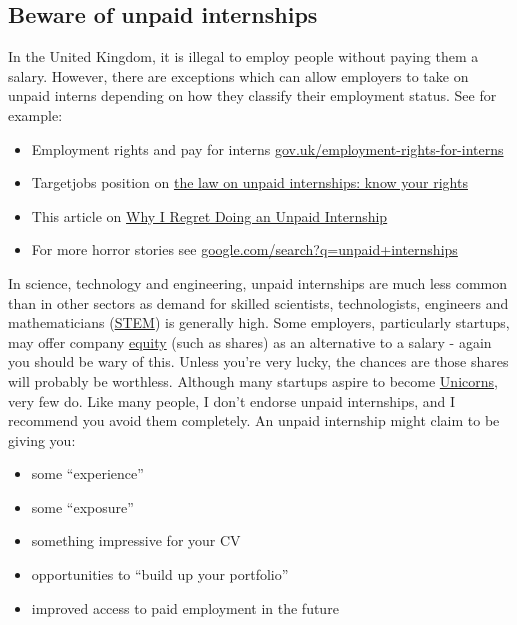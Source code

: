 \documentclass[
]{book}
\providecommand{\tightlist}{%
  \setlength{\itemsep}{0pt}\setlength{\parskip}{0pt}}
\begin{document}
\hypertarget{unpaid}{%
\subsection{Beware of unpaid internships}\label{unpaid}}

In the United Kingdom, it is illegal to employ people without paying them a salary. However, there are exceptions which can allow employers to take on unpaid interns depending on how they classify their employment status. See for example:

\begin{itemize}
\tightlist
\item
  Employment rights and pay for interns \href{https://www.gov.uk/employment-rights-for-interns}{gov.uk/employment-rights-for-interns}
\item
  Targetjobs position on \href{https://targetjobs.co.uk/internships/advice/275017-the-law-on-unpaid-internships-know-your-rights}{the law on unpaid internships: know your rights}
\item
  This article on \href{https://www.ratemyplacement.co.uk/blog/why-i-regret-doing-an-unpaid-internship/}{Why I Regret Doing an Unpaid Internship} \citep{louiseregret}
\item
  For more horror stories see \href{https://www.google.com/search?q=unpaid+internships}{google.com/search?q=unpaid+internships}
\end{itemize}

In science, technology and engineering, unpaid internships are much less common than in other sectors as demand for skilled scientists, technologists, engineers and mathematicians (\href{https://en.wikipedia.org/wiki/Science,_technology,_engineering,_and_mathematics}{STEM}) is generally high. Some employers, particularly startups, may offer company \href{https://en.wikipedia.org/wiki/Equity_(finance)}{equity} (such as shares) as an alternative to a salary - again you should be wary of this. Unless you're very lucky, the chances are those shares will probably be worthless. Although many startups aspire to become \href{https://en.wikipedia.org/wiki/Unicorn_(finance)}{Unicorns}, very few do. Like many people, I don't endorse unpaid internships, and I recommend you avoid them completely. An unpaid internship might claim to be giving you:

\begin{itemize}
\tightlist
\item
  some ``experience''
\item
  some ``exposure''
\item
  something impressive for your CV
\item
  opportunities to ``build up your portfolio''
\item
  improved access to paid employment in the future
\end{itemize}
\end{document}

